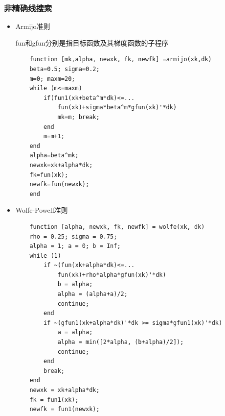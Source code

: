 \documentclass[12pt]{article} %
\begin{document}
	\subsubsection{非精确线搜索}
	\begin{itemize}
		\item Armijo准则
		
		fun和gfun分别是指目标函数及其梯度函数的子程序
		
		\begin{lstlisting}
	function [mk,alpha, newxk, fk, newfk] =armijo(xk,dk)
	beta=0.5; sigma=0.2; 
	m=0; maxm=20; 
	while (m<=maxm)
		if(fun1(xk+beta^m*dk)<=...
			fun(xk)+sigma*beta^m*gfun(xk)'*dk)
			mk=m; break; 
		end
		m=m+1;
	end
	alpha=beta^mk;
	newxk=xk+alpha*dk;
	fk=fun(xk);
	newfk=fun(newxk);
	end
		\end{lstlisting}
		\item Wolfe-Powell准则
		\begin{lstlisting}
	function [alpha, newxk, fk, newfk] = wolfe(xk, dk)
	rho = 0.25; sigma = 0.75;
	alpha = 1; a = 0; b = Inf; 
	while (1)
		if ~(fun(xk+alpha*dk)<=...
			fun(xk)+rho*alpha*gfun(xk)'*dk)
			b = alpha;
			alpha = (alpha+a)/2;
			continue;
		end
		if ~(gfun1(xk+alpha*dk)'*dk >= sigma*gfun1(xk)'*dk)
			a = alpha;
			alpha = min([2*alpha, (b+alpha)/2]);
			continue;
		end
		break;
	end
	newxk = xk+alpha*dk;
	fk = fun1(xk);
	newfk = fun1(newxk);
		\end{lstlisting}
	\end{itemize}
\end{document}
